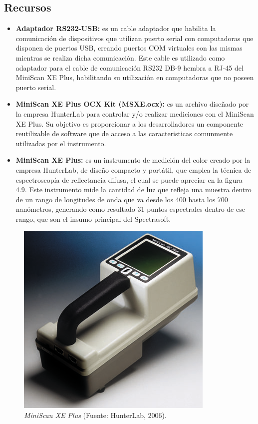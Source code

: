 	\subsection{Recursos}
	
		\begin{itemize}
			
			\item \textbf{Adaptador RS232-USB:} es un cable adaptador que habilita la comunicaci\'{o}n de dispositivos que utilizan puerto serial con computadoras que disponen de puertos USB, creando puertos COM virtuales con las mismas mientras se realiza dicha comunicaci\'{o}n. Este cable es utilizado como adaptador para el cable de comunicaci\'{o}n RS232 DB-9 hembra a RJ-45 del MiniScan XE Plus, habilitando su utilizaci\'{o}n en computadoras que no poseen puerto serial.
			
			\item \textbf{MiniScan XE Plus OCX Kit (MSXE.ocx):} es un archivo dise\~{n}ado por la empresa HunterLab para controlar y/o realizar mediciones con el MiniScan XE Plus. Su objetivo es proporcionar a los desarrolladores un componente reutilizable de software que de acceso a las caracteristicas comunmente utilizadas por el instrumento.
			
			\item \textbf{MiniScan XE Plus:} es un instrumento de medici\'{o}n del color creado por la empresa HunterLab, de dise\~{n}o compacto y port\'{a}til, que emplea la t\'{e}cnica de espectroscop\'{i}a de reflectancia difusa, el cual se puede apreciar en la figura 4.9. Este instrumento mide la cantidad de luz que refleja una muestra dentro de un rango de longitudes de onda que va desde los 400 hasta los 700 nan\'{o}metros, generando como resultado 31 puntos espectrales dentro de ese rango, que son el insumo principal del Spectrasoft.
			
		\end{itemize}
		
	\begin{figure}[H]
		\centering
		\includegraphics[scale=1]{img/MiniScanXEPlus.png}
			\caption[MiniScan XE Plus]{\textit{MiniScan XE Plus} (Fuente: HunterLab, 2006).}
	\end{figure}
\newpage
